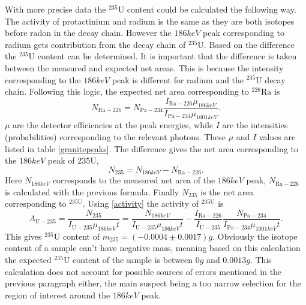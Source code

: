 \documentclass[pdftex,12pt,a4paper]{article}
\begin{document}
		With more precise data the $^{235}\text{U}$ content could be calculated the following way. The activity of protactinium and radium is the same as they are both isotopes before radon in the decay chain. However the $186keV$ peak corresponding to radium gets contribution from the decay chain of $^{235}\text{U}$. Based on the difference the $^{235}\text{U}$ content can be determined. It is important that the difference is taken between the measured and expected net areas. This is because the intensity corresponding to the $186keV$ peak is different for radium and the $^{235}\text{U}$ decay chain. Following this logic, the expected net area corresponding to $^{226}\text{Ra}$ is
		\begin{equation}
			N_{\text{Ra}-226} = N_{\text{Pa}-234}\frac{I_{\text{Ra}-226}\mu_{186keV}}{I_{\text{Pa}-234}{\mu_{1001keV}}}.
		\end{equation}
		$\mu$ are the detector efficiencies at the peak energies, while $I$ are the intensities (probabilities) corresponding to the relevant photons. These $\mu$ and $I$ values are listed in table \ref{granitepeaks}. The difference gives the net area corresponding to the $186keV$ peak of ${235\text{U}}$,
		\begin{equation}
			N_{235} = N_{186keV} - N_{\text{Ra}-226}.
		\end{equation}
		Here $N_{186keV}$ corresponds to the measured net area of the $186keV$ peak, $N_{\text{Ra}-226}$ is calculated with the previous formula. Finally $N_{235}$ is the net area corresponding to $^{235\text{U}}$. Using \eqref{activity} the activity of $^{235\text{U}}$ is
		\begin{equation}
			A_{\text{U}-235} = \frac{N_{235}}{I_{\text{U}-235}\mu_{186keV} t} = \frac{N_{186keV}}{I_{\text{U}-235}\mu_{186keV} t} - \frac{I_{\text{Ra}-226}}{I_{\text{U}-235}}\frac{N_{\text{Pa}-234}}{I_{\text{Pa}-234}\mu_{1001keV} t}.
		\end{equation}
		This gives $^{235}\text{U}$ content of $m_{235} = (-0.0004\pm0.0017)g$. Obviously the isotope content of a sample can't have negative mass, meaning based on this calculation the expected $^{235}\text{U}$ content of the sample is between $0g$ and $0.0013g$. This calculation does not account for possible sources of errors mentioned in the previous paragraph either, the main suspect being a too narrow selection for the region of interest around the $186keV$ peak.
		
\end{document}
